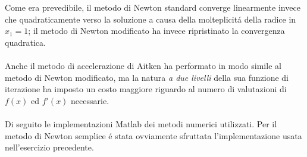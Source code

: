 \normalsize\noindent Come era prevedibile, il metodo di Newton standard converge linearmente invece che quadraticamente verso la soluzione a causa della molteplicit\'a della radice in \(x_1=1\); il metodo di Newton modificato ha invece ripristinato la convergenza quadratica.
\\
\\
\noindent Anche il metodo di accelerazione di Aitken ha performato in modo simile al metodo di Newton modificato, ma la natura \textit{a due livelli} della sua funzione di iterazione ha imposto un costo maggiore riguardo al numero di valutazioni di \(f(x)\) ed \(f'(x)\) necessarie.
\\
\\
\noindent Di seguito le implementazioni Matlab dei metodi numerici utilizzati. Per il metodo di Newton semplice \'e stata ovviamente sfruttata l'implementazione usata nell'esercizio precedente.
\\

